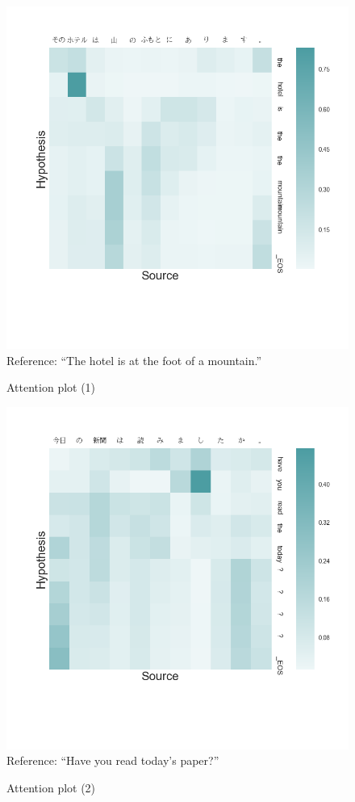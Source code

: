 \documentclass[answers]{exam}
\begin{document}
\begin{CJK}{UTF8}{min}
\begin{figure}
  \centering
  \includegraphics[width=\linewidth]{fig-plot-1}
  Reference: ``The hotel is at the foot of a mountain.''
  \caption{Attention plot (1)}
  \label{fig:plot-1}
\end{figure}

\begin{figure}
  \centering
  \includegraphics[width=\linewidth]{fig-plot-2}
  Reference: ``Have you read today's paper?''
  \caption{Attention plot (2)}
  \label{fig:plot-2}
\end{figure}


\end{CJK}
\end{document}
